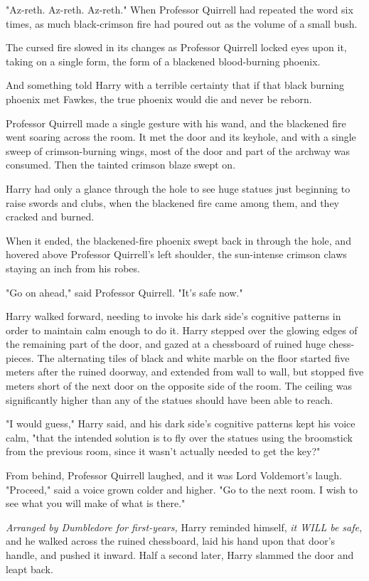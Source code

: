 "Az-reth. Az-reth. Az-reth." When Professor Quirrell had repeated the word six 
times, as much black-crimson fire had poured out as the volume of a small bush.

The cursed fire slowed in its changes as Professor Quirrell locked eyes upon 
it, taking on a single form, the form of a blackened blood-burning phoenix.

And something told Harry with a terrible certainty that if that black burning 
phoenix met Fawkes, the true phoenix would die and never be reborn.

Professor Quirrell made a single gesture with his wand, and the blackened fire 
went soaring across the room. It met the door and its keyhole, and with a 
single sweep of crimson-burning wings, most of the door and part of the archway 
was consumed. Then the tainted crimson blaze swept on.

Harry had only a glance through the hole to see huge statues just beginning to 
raise swords and clubs, when the blackened fire came among them, and they 
cracked and burned.

When it ended, the blackened-fire phoenix swept back in through the hole, and 
hovered above Professor Quirrell's left shoulder, the sun-intense crimson claws 
staying an inch from his robes.

"Go on ahead," said Professor Quirrell. "It's safe now."

Harry walked forward, needing to invoke his dark side's cognitive patterns in 
order to maintain calm enough to do it. Harry stepped over the glowing edges of 
the remaining part of the door, and gazed at a chessboard of ruined huge 
chess-pieces. The alternating tiles of black and white marble on the floor 
started five meters after the ruined doorway, and extended from wall to wall, 
but stopped five meters short of the next door on the opposite side of the 
room. The ceiling was significantly higher than any of the statues should have 
been able to reach.

"I would guess," Harry said, and his dark side's cognitive patterns kept his 
voice calm, "that the intended solution is to fly over the statues using the 
broomstick from the previous room, since it wasn't actually needed to get the 
key?"

From behind, Professor Quirrell laughed, and it was Lord Voldemort's laugh. 
"Proceed," said a voice grown colder and higher. "Go to the next room. I wish 
to see what you will make of what is there."

\emph{Arranged by Dumbledore for first-years,} Harry reminded himself, \emph{it 
WILL be safe,} and he walked across the ruined chessboard, laid his hand upon 
that door's handle, and pushed it inward.
\sbreak
Half a second later, Harry slammed the door and leapt back.

